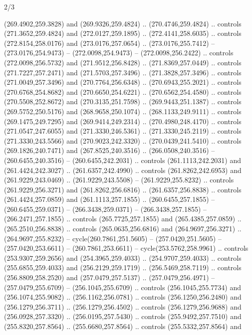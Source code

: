 \begin{flagdescription}{2/3}
\begin{scope}[xshift=0.5\flaglength,yshift=0.5\flagwidth,scale=\flagwidth/235.81]
\begin{scope}[y=0.8pt, x=0.8pt, yscale=-1,shift={(-239.08,-147.38)}]
    (269.4902,259.3828) and (269.9326,259.4824) .. (270.4746,259.4824) .. controls
    (271.3652,259.4824) and (272.0127,259.1895) .. (272.4141,258.6035) .. controls
    (272.8154,258.0176) and (273.0176,257.0654) .. (273.0176,255.7412) --
    (273.0176,254.9473) -- (272.0098,254.9473) -- (272.0098,256.2422) .. controls
    (272.0098,256.5732) and (271.9512,256.8428) .. (271.8369,257.0449) .. controls
    (271.7227,257.2471) and (271.5703,257.3496) .. (271.3828,257.3496) .. controls
    (271.0049,257.3496) and (270.7764,256.6348) .. (270.6943,255.2021) .. controls
    (270.6768,254.8682) and (270.6650,254.6221) .. (270.6562,254.4580) .. controls
    (270.5508,252.8672) and (270.3135,251.7598) .. (269.9443,251.1387) .. controls
    (269.5752,250.5176) and (268.9658,250.1074) .. (268.1133,249.9111) .. controls
    (269.1475,249.7295) and (269.9414,249.2314) .. (270.4980,248.4170) .. controls
    (271.0547,247.6055) and (271.3330,246.5361) .. (271.3330,245.2119) .. controls
    (271.3330,243.5566) and (270.9023,242.3320) .. (270.0439,241.5410) .. controls
    (269.1826,240.7471) and (267.8525,240.3516) .. (266.0508,240.3516) --
    (260.6455,240.3516) -- (260.6455,242.2031) .. controls (261.1113,242.2031) and
    (261.4424,242.3027) .. (261.6357,242.4990) .. controls (261.8262,242.6953) and
    (261.9229,243.0469) .. (261.9229,243.5508) -- (261.9229,255.8232) .. controls
    (261.9229,256.3271) and (261.8262,256.6816) .. (261.6357,256.8838) .. controls
    (261.4424,257.0859) and (261.1113,257.1855) .. (260.6455,257.1855) --
    (260.6455,259.0371) -- (266.3438,259.0371) -- (266.3438,257.1855) --
    (266.2471,257.1855) .. controls (265.7725,257.1855) and (265.4385,257.0859) ..
    (265.2510,256.8838) .. controls (265.0635,256.6816) and (264.9697,256.3271) ..
    (264.9697,255.8232) -- cycle(260.7861,251.5605) -- (257.0420,251.5605) --
    (257.0420,253.6611) -- (260.7861,253.6611) -- cycle(253.5762,258.9961) ..
    controls (253.9307,259.2656) and (254.3965,259.4033) .. (254.9707,259.4033) ..
    controls (255.6855,259.4033) and (256.2129,259.1719) .. (256.5469,258.7119) ..
    controls (256.8809,258.2520) and (257.0479,257.5137) .. (257.0479,256.4971) --
    (257.0479,255.6709) -- (256.1045,255.6709) .. controls (256.1045,255.7734) and
    (256.1074,255.9082) .. (256.1162,256.0781) .. controls (256.1250,256.2480) and
    (256.1279,256.3711) .. (256.1279,256.4502) .. controls (256.1279,256.9688) and
    (256.0928,257.3320) .. (256.0195,257.5430) .. controls (255.9492,257.7510) and
    (255.8320,257.8564) .. (255.6680,257.8564) .. controls (255.5332,257.8564) and

\end{scope}
\end{scope}
\end{flagdescription}
